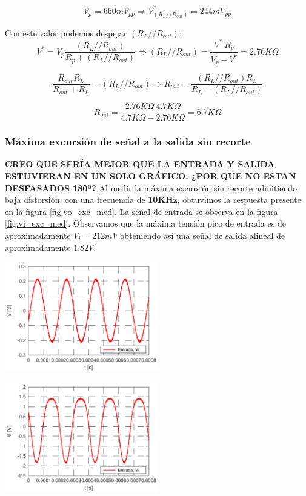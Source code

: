 \documentclass[a4paper, 10pt, spanish]{article}
\begin{document}
\begin{equation}
  V_p= 660mV_{pp} \Rightarrow V^*_{(R_L//R_{out})} = 244 mV_{pp}
\end{equation}

Con este valor podemos despejar $(R_L//R_{out})$:
\begin{equation}
  V^*=V_p \frac{(R_L//R_{out})}{R_p + (R_L//R_{out})} \Rightarrow (R_L//R_{out}) = \frac{V^*\ R_p}{V_p-V^*} = 2.76K\Omega
\end{equation}

\begin{equation}
  \frac{R_{out}R_L}{R_{out}+R_L} = (R_L//R_{out})  \Rightarrow R_{out}=\frac{(R_L//R_{out}) R_L}{R_L - (R_L//R_{out})}
\end{equation}

\begin{equation}
  R_{out}=\frac{2.76K\Omega\ 4.7K\Omega}{4.7K\Omega - 2.76K\Omega}=6.7K\Omega
\end{equation}

\subsubsection{Máxima excursión de señal a la salida sin recorte}
\textbf{CREO QUE SERÍA MEJOR QUE LA ENTRADA Y SALIDA ESTUVIERAN EN UN SOLO GRÁFICO. ¿POR QUE NO ESTAN DESFASADOS 180º?}
Al medir la máxima excursión sin recorte admitiendo baja distorsión, con una frecuencia de \textbf{10KHz}, obtuvimos la respuesta presente en la figura \ref{fig:vo_exc_med}. La señal de entrada se observa en la figura \ref{fig:vi_exc_med}. Observamos que la máxima tensión pico de entrada es de aproximadamente $V_i=212mV$ obteniendo así una señal de salida alineal de aproximadamente $1.82V$.

\begin{center}
  \includegraphics[width=0.5\textwidth]{vi3.png}
  \label{fig:vi_exc_med}
\end{center}

\begin{center}
  \includegraphics[width=0.5\textwidth]{vo3.png}
  \label{fig:vo_exc_med}
\end{center}
\end{document}
